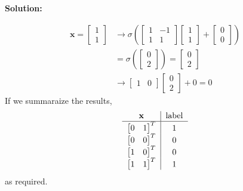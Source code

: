 \documentclass{article}
\newenvironment{solution}
  {\par\noindent\textbf{Solution:}\par}
  {\par}
\begin{document}
\begin{solution}
\[ 
\begin{aligned}
\mathbf{x}= \begin{bmatrix}
1 \\
1
\end{bmatrix} &\to \sigma(\begin{bmatrix}
1 & -1  \\
1 & 1
\end{bmatrix}\begin{bmatrix}
1 \\
1
\end{bmatrix} + \begin{bmatrix}
0 \\
0
\end{bmatrix}) \\
&= \sigma(\begin{bmatrix}
0  \\
2
\end{bmatrix}) = \begin{bmatrix}
0 \\
2
\end{bmatrix} \\ 
&\to \begin{bmatrix}
1 & 0
\end{bmatrix}\begin{bmatrix}
0 \\
2
\end{bmatrix}+0 =0 
\end{aligned}
\]
If we summaraize the results,
\[
\begin{tabular}{c|c}
  \textbf{x} & \text{label} \\
  \hline
  $\begin{bmatrix}
    0 & 1 
  \end{bmatrix}^T$ & 1 \\
  $\begin{bmatrix}
    0 & 0 
  \end{bmatrix}^T$ & 0 \\
   $\begin{bmatrix}
    1 & 0 
  \end{bmatrix}^T$ & 0 \\
  $\begin{bmatrix}
    1 & 1 
  \end{bmatrix}^T$ & 1 \\
  
\end{tabular}
\]
as required.
\end{solution}
\end{document}
